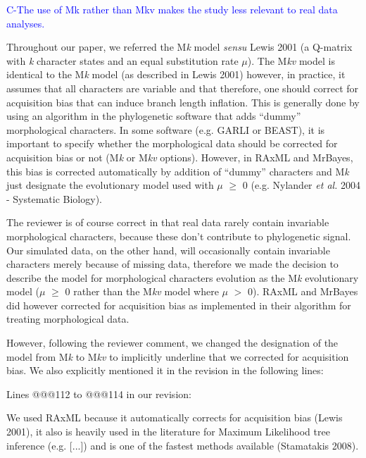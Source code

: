 \documentclass[11pt]{letter}
\begin{document}
\begin{letter}{}
\textcolor{blue}{C-The use of Mk rather than Mkv makes the study less relevant to real data analyses.}


Throughout our paper, we referred the M\textit{k} model \textit{sensu} Lewis 2001 (a Q-matrix with \textit{k} character states and an equal substitution rate $\mu$). The M\textit{kv} model is identical to the M\textit{k} model (as described in Lewis 2001) however, in practice, it assumes that all characters are variable and that therefore, one should correct for acquisition bias that can induce branch length inflation. This is generally done by using an algorithm in the phylogenetic software that adds ``dummy'' morphological characters. In some software (e.g. GARLI or BEAST), it is important to specify whether the morphological data should be corrected for acquisition bias or not (M\textit{k} or M\textit{kv} options). However, in RAxML and MrBayes, this bias is corrected automatically by addition of ``dummy'' characters and M\textit{k} just designate the evolutionary model used with $\mu$ $\geq$ 0 (e.g. Nylander \textit{et al.} 2004 - Systematic Biology). 

The reviewer is of course correct in that real data rarely contain invariable morphological characters, because these don't contribute to phylogenetic signal. Our simulated data, on the other hand, will occasionally contain invariable characters merely because of missing data, therefore we made the decision to describe the model for morphological characters evolution as the M\textit{k} evolutionary model ($\mu$ $\geq$ 0 rather than the M\textit{kv} model where $\mu$ $>$ 0). RAxML and MrBayes did however corrected for acquisition bias as implemented in their algorithm for treating morphological data.

However, following the reviewer comment, we changed the designation of the model from M\textit{k} to M\textit{kv} to implicitly underline that we corrected for acquisition bias. We also explicitly mentioned it in the revision in the following lines:

Lines @@@112 to @@@114 in our revision:

\hfill\begin{minipage}{\dimexpr\textwidth-1cm}
We used RAxML because it automatically corrects for acquisition bias (Lewis 2001), it also is heavily used in the literature for Maximum Likelihood tree inference (e.g. [...]) and is one of the fastest methods available (Stamatakis 2008).
\end{minipage}


\end{letter}
\end{document}
